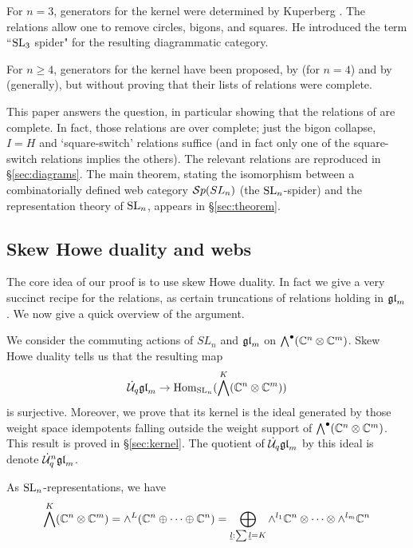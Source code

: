 \documentclass[10pt,leqno]{article}
\begin{document}
For $n=3$, generators for the kernel were determined by Kuperberg \cite{MR1403861}.  The relations allow one to remove circles, bigons, and squares.  He introduced the term ``${\rm{SL}}_3$ spider" for the resulting diagrammatic category.

For $n \geq 4$, generators for the kernel have been proposed, by \cite{math.QA/0310143} (for $n=4$) and by \cite{0704.1503} (generally), but without proving that their lists of relations were complete.

This paper answers the question, in particular showing that the relations of \cite{0704.1503} are complete. In fact, those relations are over complete; just the bigon collapse, $I=H$ and `square-switch' relations suffice (and in fact only one of the square-switch relations implies the others). The relevant relations are reproduced in \S\ref{sec:diagrams}.
The main theorem, stating the isomorphism between a combinatorially defined web category ${\mathcal{S}p}(SL_n)$ (the ${\rm{SL}}_n $-spider) and the representation theory of ${\rm{SL}}_n$, appears in \S \ref{sec:theorem}.


\subsection{Skew Howe duality and webs}
The core idea of our proof is to use skew Howe duality.  In fact we give a very succinct recipe for the relations, as certain truncations of relations holding in ${\mathfrak{gl}}_m$.  We now give a quick overview of the argument.

We consider the commuting actions of $ SL_n $ and $ {\mathfrak{gl}}_m $ on $\bigwedge^\bullet(\mathbb{C}^n \otimes \mathbb{C}^m)$.  Skew Howe duality tells us that the resulting map
\begin{equation}
\dot{{\mathcal{U}}}_q{\mathfrak{gl}}_m \rightarrow \operatorname{Hom}_{{\rm{SL}}_n}(\bigwedge^K(\mathbb{C}^n \otimes \mathbb{C}^m))
\end{equation}
is surjective.  Moreover, we prove that its kernel is the ideal generated by those weight space idempotents falling outside the weight support of $\bigwedge^\bullet(\mathbb C^n \otimes \mathbb C^m)$.  This result is proved in \S \ref{sec:kernel}.  The quotient of $ \dot{{\mathcal{U}}}_q{\mathfrak{gl}}_m $ by this ideal is denote $\dot{{\mathcal{U}}}_q^n{\mathfrak{gl}}_m$.

As ${\rm{SL}}_n$-representations, we have
\begin{equation*}
\bigwedge^K(\mathbb C^n \otimes \mathbb C^m)  = \wedge^L(\mathbb C^n \oplus \cdots \oplus \mathbb C^n)
         = \bigoplus_{\underline{l}: \sum \underline{l} = K} \wedge^{l_1} \mathbb C^n \otimes \cdots \otimes \wedge^{l_m} \mathbb C^n
\end{equation*}
\end{document}
